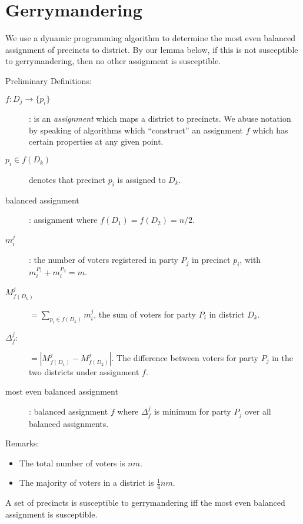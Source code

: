 \documentclass[12pt]{article}
\begin{document}
\pagebreak

\section{Gerrymandering}

We use a dynamic programming algorithm to determine the most even balanced
assignment of precincts to district. By our lemma below, if this is not
susceptible to gerrymandering, then no other assignment is susceptible.

Preliminary Definitions:

\begin{description}
\item[$f:D_j \rightarrow \{p_i\}$]:
is an \textit{assignment} which maps a district to precincts.
We abuse notation by speaking of algorithms which ``construct'' an
assignment $f$ which has certain properties at any given point.
\item[$p_i \in f(D_k)$] denotes that precinct $p_i$ is assigned to $D_k$.
\item[balanced assignment]: assignment where $f(D_1)=f(D_2)=n/2$.
\item[$m^{j}_i$]:
the number of voters registered in party $P_j$ in precinct $p_i$,
with $m^{P_1}_i + m^{P_2}_i = m$.
\item[$M^{j}_{f(D_k)}$]$=\sum_{p_i \in f(D_k)}{m^{j}_i}$,
the sum of voters for party $P_i$ in district $D_k$.
\item[$\Delta^{j}_{f}$:]$=|M^{j}_{f(D_1)} - M^{j}_{f(D_2)}|$.
The difference between voters for party $P_j$ in the two districts under
assignment $f$.
\item[most even balanced assignment]: balanced assignment $f$ where
$\Delta^{j}_{f}$ is minimum for party $P_j$ over all balanced assignments.
\end{description}

Remarks:
\begin{itemize}
\item The total number of voters is $nm$.
\item The majority of voters in a district is $\frac{1}{4}nm$.
\end{itemize}

\begin{lemma}
A set of precincts is susceptible to gerrymandering iff the
most even balanced assignment is susceptible.
\end{lemma}
\end{document}
